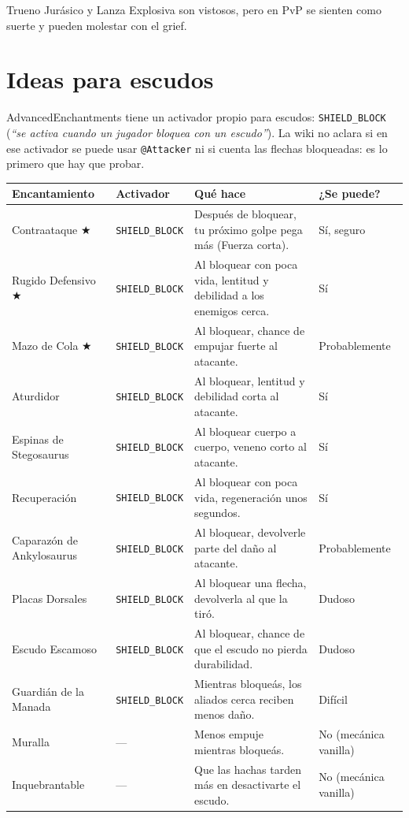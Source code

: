 \documentclass[11pt,a4paper]{article}
\newcommand{\tr}[1]{\texttt{\small #1}}           %
\newcommand{\rec}{\textcolor{rosa}{\textbf{$\bigstar$}}} %
\begin{document}
Trueno Jurásico y Lanza Explosiva son vistosos, pero en PvP se sienten como suerte y pueden molestar con el grief.

\section{Ideas para escudos}

AdvancedEnchantments tiene un activador propio para escudos: \tr{SHIELD\_BLOCK} (\emph{``se activa cuando un
jugador bloquea con un escudo''}). La wiki no aclara si en ese activador se puede usar \tr{@Attacker} ni si cuenta
las flechas bloqueadas: es lo primero que hay que probar.

\begin{longtable}{L{3.4cm} L{2.7cm} L{6.4cm} L{2.8cm}}
\toprule
\textbf{Encantamiento} & \textbf{Activador} & \textbf{Qué hace} & \textbf{¿Se puede?}\\
\midrule
\endhead
Contraataque \rec & \tr{SHIELD\_BLOCK} & Después de bloquear, tu próximo golpe pega más (Fuerza corta). & Sí, seguro\\
Rugido Defensivo \rec & \tr{SHIELD\_BLOCK} & Al bloquear con poca vida, lentitud y debilidad a los enemigos cerca. & Sí\\
Mazo de Cola \rec & \tr{SHIELD\_BLOCK} & Al bloquear, chance de empujar fuerte al atacante. & Probablemente\\
Aturdidor & \tr{SHIELD\_BLOCK} & Al bloquear, lentitud y debilidad corta al atacante. & Sí\\
Espinas de Stegosaurus & \tr{SHIELD\_BLOCK} & Al bloquear cuerpo a cuerpo, veneno corto al atacante. & Sí\\
Recuperación & \tr{SHIELD\_BLOCK} & Al bloquear con poca vida, regeneración unos segundos. & Sí\\
Caparazón de Ankylosaurus & \tr{SHIELD\_BLOCK} & Al bloquear, devolverle parte del daño al atacante. & Probablemente\\
Placas Dorsales & \tr{SHIELD\_BLOCK} & Al bloquear una flecha, devolverla al que la tiró. & Dudoso\\
Escudo Escamoso & \tr{SHIELD\_BLOCK} & Al bloquear, chance de que el escudo no pierda durabilidad. & Dudoso\\
Guardián de la Manada & \tr{SHIELD\_BLOCK} & Mientras bloqueás, los aliados cerca reciben menos daño. & Difícil\\
Muralla & --- & Menos empuje mientras bloqueás. & No (mecánica vanilla)\\
Inquebrantable & --- & Que las hachas tarden más en desactivarte el escudo. & No (mecánica vanilla)\\
\bottomrule
\end{longtable}
\end{document}
